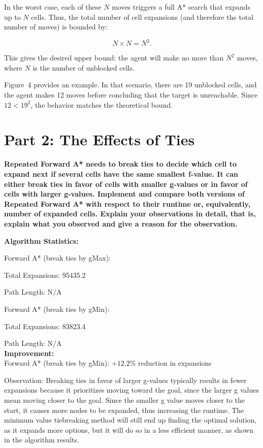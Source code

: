 \documentclass[12pt]{article}
\begin{document}
In the worst case, each of these $N$ moves triggers a full A* search that expands up to $N$ cells.
Thus, the total number of cell expansions (and therefore the total number of moves) is bounded by:



\[
N \times N = N^2.
\]



This gives the desired upper bound: the agent will make no more than $N^2$ moves, where $N$ is the
number of unblocked cells.

Figure~4 provides an example. In that scenario, there are 19 unblocked cells, and the agent makes
12 moves before concluding that the target is unreachable. Since $12 < 19^2$, the behavior matches
the theoretical bound.

\section{Part 2: The Effects of Ties}

\textbf{Repeated Forward A* needs to break ties to decide which cell to expand next if several cells have the same smallest f-value. It can either break ties in favor of cells with smaller g-values or in favor of cells with larger g-values. Implement and compare both versions of Repeated Forward A* with respect to their runtime or, equivalently, number of expanded cells. Explain your observations in detail, that is, explain what you observed and give a reason for the observation.
}

\textbf{Algorithm Statistics:}

Forward A* (break ties by gMax):

   Total Expansions: 95435.2
   
   Path Length: N/A

Forward A* (break ties by gMin):


  Total Expansions: 83823.4
  
  Path Length: N/A
  \textbf{\\Improvement:}
  \\Forward A* (break ties by gMin): $+12.2\%$ reduction in expansions

Observation: Breaking ties in favor of larger g-values typically results in fewer expansions because it prioritizes moving toward the goal, since the larger g values mean moving closer to the goal. Since the smaller g value moves closer to the start, it causes more nodes to be expanded, thus increasing the runtime. The minimum value tiebreaking method will still end up finding the optimal solution, as it expands more options, but it will do so in a less efficient manner, as shown in the algorithm results.
  
\end{document}
